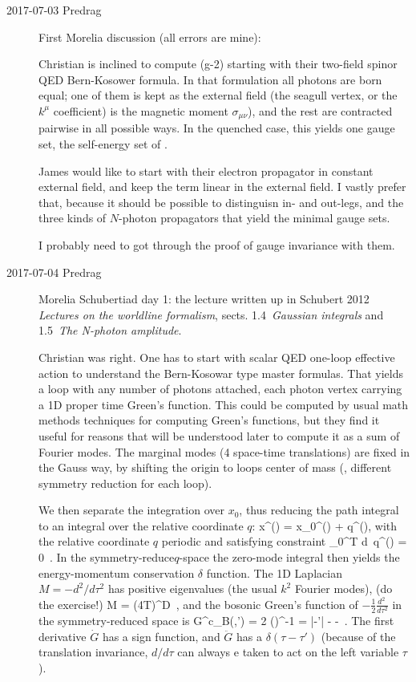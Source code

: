 \begin{description}

\item[2017-07-03 Predrag] First Morelia discussion (all errors are mine):

Christian is inclined to compute (g-2) starting with their two-field
spinor QED Bern-Kosower formula. In that formulation all photons are born equal;
one of them is kept as the external field (the seagull vertex, or the $k^\mu$
coefficient) is the
magnetic moment $\sigma_{\mu\nu}$), and the rest are contracted pairwise in
all possible ways. In the quenched case, this yields one gauge set,
the self-energy set of .

James would like to start with their electron propagator in constant
external field, and keep the term linear in the external field. I vastly
prefer that, because it should be possible to distinguisn in- and
out-legs, and the three kinds of $N$-photon propagators that yield the
minimal gauge sets.

I probably need to got through the proof of gauge invariance with them.

\item[2017-07-04 Predrag] Morelia Schubertiad day 1:
the lecture written up in Schubert 2012 {\em Lectures on
the worldline formalism}, sects. 1.4~{\em Gaussian integrals} and
1.5~{\em The N-photon amplitude}.

Christian was right. One has to start with scalar QED one-loop effective
action to understand the Bern-Kosowar type master formulas. That yields a
loop with any number of photons attached, each photon vertex carrying a
1D proper time Green's function. This could be computed by usual math
methods techniques for computing Green's functions, but they find it
useful for reasons that will be understood later to compute it as a sum
of Fourier modes. The marginal modes (4 space-time translations) are fixed
in the Gauss way, by shifting the origin to loops center of mass (\ie,
different symmetry reduction for each loop).

We then separate the integration over $x_0$, thus reducing the path integral
to an integral over the relative coordinate $q$:
\beq
x^{\mu}(\tau) = x_0^{\mu}(\tau) + q^{\mu}(\tau),
with  the relative coordinate $q$ periodic and satisfying constraint
\beq
\int_0^T d\tau\, q^{\mu}(\tau) = 0
\,.
In the symmetry-reduce$q$-space the zero-mode integral then yields
the energy-momentum conservation $\delta$ function. The 1D Laplacian
$M=-d^2/d\tau^2$ has positive eigenvalues (the usual $k^2$ Fourier modes),
(do the exercise!)
\beq
\det M = (4T)^D
\,,
and the bosonic Green's function of $-\frac{1}{2}\frac{d^2~}{d\tau^2}$ in
the symmetry-reduced space is
\beq
G^c_B(\tau,\tau')
= 2 \bra{\tau}\left(\right)^{-1}
= |\tau-\tau'| -  - 
\,.
The first derivative $\dot{G}$  has a sign function, and $\ddot{G}$ has a
$\delta(\tau-\tau')$ (because of the translation invariance, $d/d\tau$
can always e taken to act on the left variable $\tau$).


\end{description}

